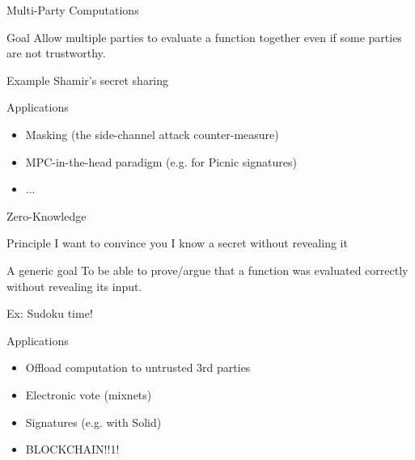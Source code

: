 \documentclass[presentation,aspectratio=1610]{beamer}
\begin{document}
\begin{frame}{Multi-Party Computations}
  \begin{exampleblock}{Goal}
    Allow multiple parties to evaluate a function together even if some parties are not trustworthy.
  \end{exampleblock}

  \pause
  
  \begin{alertblock}{Example}
    Shamir's secret sharing
  \end{alertblock}

  \pause

  \begin{block}{Applications}
    \begin{itemize}
    \item Masking (the side-channel attack counter-measure)
    \item MPC-in-the-head paradigm (e.g. for Picnic signatures)
    \item ...
    \end{itemize}
  \end{block}
\end{frame}




\begin{frame}{Zero-Knowledge}
  \begin{exampleblock}{Principle}
    I want to convince you I know a secret \alert{without revealing it}
  \end{exampleblock}

  \pause
  \begin{block}{A generic goal}
    To be able to prove/argue that a function was evaluated correctly
    without revealing its input.

    \pause

    Ex: Sudoku time!
  \end{block}


  \pause
  
  \begin{block}{Applications}
    \begin{itemize}
    \item Offload computation to untrusted 3rd parties
    \item Electronic vote (mixnets)
    \item Signatures (e.g. with Solid)
      \pause
    \item BLOCKCHAIN!!1!
    \end{itemize}
  \end{block}
\end{frame}
\end{document}
